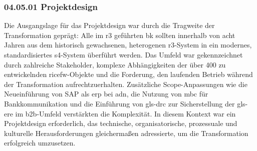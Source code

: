 \subsubsection*{04.05.01 Projektdesign}
{}
\label{sec:04.05.01_Projektdesign}


\par Die Ausgangslage für das Projektdesign war durch die Tragweite der Transformation geprägt: Alle im \gls{r3} geführten \gls{bk} sollten innerhalb von acht Jahren aus dem historisch gewachsenen, heterogenen \gls{r3}-System in ein modernes, standardisiertes \gls{s4}-System überführt werden. Das Umfeld war gekennzeichnet durch zahlreiche Stakeholder, komplexe Abhängigkeiten der über 400 zu entwickelnden \gls{ricefw}-Objekte und die Forderung, den laufenden Betrieb während der Transformation aufrechtzuerhalten. Zusätzliche Scope-Anpassungen wie die Neueinführung von SAP als \gls{erp} bei \gls{adn}, die Nutzung von \gls{mbc} für Bankkommunikation und die Einführung von \gls{gls-drc} zur Sicherstellung der \gls{gls-ere} im \gls{b2b}-Umfeld verstärkten die Komplexität. In diesem Kontext war ein Projektdesign erforderlich, das technische, organisatorische, prozessuale und kulturelle Herausforderungen gleichermaßen adressierte, um die Transformation erfolgreich umzusetzen.